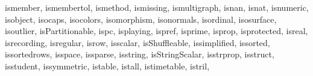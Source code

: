 {{        ismember,%
        ismembertol,%
        ismethod,%
        ismissing,%
        ismultigraph,%
        isnan,%
        isnat,%
        isnumeric,%
        isobject,%
        isocaps,%
        isocolors,%
        isomorphism,%
        isonormals,%
        isordinal,%
        isosurface,%
        isoutlier,%
        isPartitionable,%
        ispc,%
        isplaying,%
        ispref,%
        isprime,%
        isprop,%
        isprotected,%
        isreal,%
        isrecording,%
        isregular,%
        isrow,%
        isscalar,%
        isShuffleable,%
        issimplified,%
        issorted,%
        issortedrows,%
        isspace,%
        issparse,%
        isstring,%
        isStringScalar,%
        isstrprop,%
        isstruct,%
        isstudent,%
        issymmetric,%
        istable,%
        istall,%
        istimetable,%
        istril,%
}}
